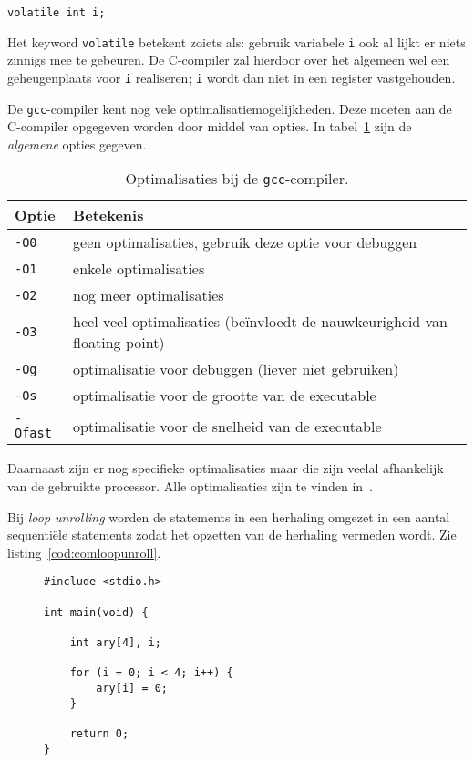 \begin{lstlisting}[style=lstoneline]
volatile int i;
\end{lstlisting}

Het keyword \texttt{volatile} betekent zoiets als: gebruik variabele \texttt{i} ook al lijkt er niets zinnigs mee te gebeuren. De C-compiler zal hierdoor over het algemeen wel een geheugenplaats voor \texttt{i} realiseren; \texttt{i} wordt dan niet in een register vastgehouden.

De \texttt{gcc}-compiler kent nog vele optimalisatiemogelijkheden. Deze moeten aan de C-compiler opgegeven worden door middel van opties. In tabel~\ref{tab:comoptimalisaties} zijn de \textsl{algemene} opties gegeven.

\begin{table}[!ht]
\centering
\caption{Optimalisaties bij de \texttt{gcc}-compiler.}
\label{tab:comoptimalisaties}
\begin{tabular}{ll}
Optie & Betekenis \\
\midrule
\texttt{-O0} & geen optimalisaties, gebruik deze optie voor debuggen \\
\texttt{-O1} & enkele optimalisaties \\
\texttt{-O2} & nog meer optimalisaties \\
\texttt{-O3} & heel veel optimalisaties (beïnvloedt de nauwkeurigheid van floating point)\\
\texttt{-Og} & optimalisatie voor debuggen (liever niet gebruiken) \\
\texttt{-Os} & optimalisatie voor de grootte van de executable \\
\texttt{-Ofast} & optimalisatie voor de snelheid van de executable \\
\end{tabular}
\end{table}

Daarnaast zijn er nog specifieke optimalisaties maar die zijn veelal afhankelijk van de gebruikte processor. Alle optimalisaties zijn te vinden in~\cite{gnugcc2}.

Bij \textsl{loop unrolling} worden de statements in een herhaling omgezet in een aantal sequentiële statements zodat het opzetten van de herhaling vermeden wordt. Zie listing~\ref{cod:comloopunroll}.

\begin{figure}[!ht]
\begin{lstlisting}[caption=Een C-programma.,label=cod:comloopunroll]
#include <stdio.h>

int main(void) {

    int ary[4], i;
    
    for (i = 0; i < 4; i++) {
        ary[i] = 0;
    }
    
    return 0;
}
\end{lstlisting}
\end{figure}

